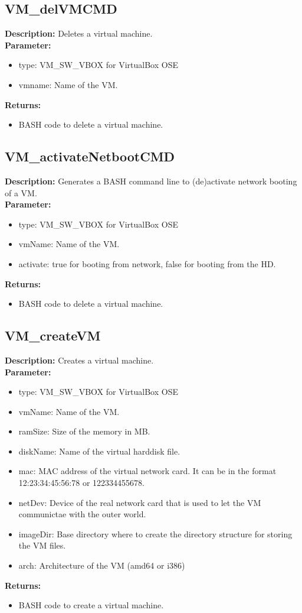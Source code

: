 \subsection{VM\_delVMCMD}
\textbf{Description:} Deletes a virtual machine.\\
\textbf{Parameter:}
\begin{itemize}
\item type: VM\_SW\_VBOX for VirtualBox OSE
\item vmname: Name of the VM.
\end{itemize}
\textbf{Returns:}
\begin{itemize}
\item BASH code to delete a virtual machine.
\end{itemize}

\subsection{VM\_activateNetbootCMD}
\textbf{Description:} Generates a BASH command line to (de)activate network booting of a VM.\\
\textbf{Parameter:}
\begin{itemize}
\item type: VM\_SW\_VBOX for VirtualBox OSE
\item vmName: Name of the VM.
\item activate: true for booting from network, false for booting from the HD.
\end{itemize}
\textbf{Returns:}
\begin{itemize}
\item BASH code to delete a virtual machine.
\end{itemize}

\subsection{VM\_createVM}
\textbf{Description:} Creates a virtual machine.\\
\textbf{Parameter:}
\begin{itemize}
\item type: VM\_SW\_VBOX for VirtualBox OSE
\item vmName: Name of the VM.
\item ramSize: Size of the memory in MB.
\item diskName: Name of the virtual harddisk file.
\item mac: MAC address of the virtual network card. It can be in the format 12:23:34:45:56:78 or 122334455678.
\item netDev: Device of the real network card that is used to let the VM communictae with the outer world.
\item imageDir: Base directory where to create the directory structure for storing the VM files.
\item arch: Architecture of the VM (amd64 or i386)
\end{itemize}
\textbf{Returns:}
\begin{itemize}
\item BASH code to create a virtual machine.
\end{itemize}

